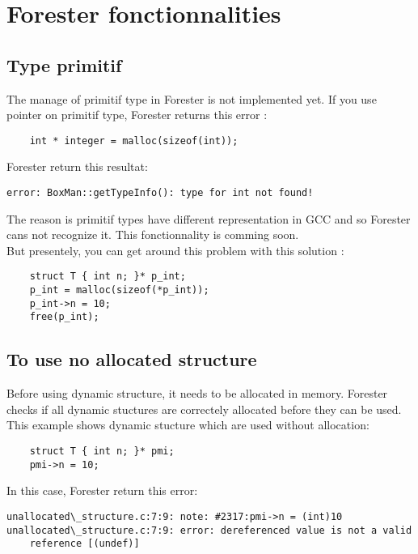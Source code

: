 \section {Forester fonctionnalities}

	\subsection{Type primitif}

The manage of primitif type in Forester is not implemented yet. If you use pointer on primitif type, Forester returns this error :

\begin{lstlisting}
	int * integer = malloc(sizeof(int));
\end{lstlisting}
\bigskip

Forester return this resultat:
\begin{lstlisting}
error: BoxMan::getTypeInfo(): type for int not found!
\end{lstlisting}
\bigskip


The reason is primitif types have different representation in GCC and so Forester cans not recognize it. This fonctionnality is comming soon.
\\

But presentely, you can get around this problem with this solution :
\begin{lstlisting}
	struct T { int n; }* p_int;
	p_int = malloc(sizeof(*p_int));
	p_int->n = 10;
	free(p_int);
\end{lstlisting}
\bigskip

	\subsection{To use no allocated structure}
	
Before using dynamic structure, it needs to be allocated in memory. Forester checks if all dynamic stuctures are correctely allocated before they can be used. This example shows dynamic stucture which are used without allocation:
\begin{lstlisting}
	struct T { int n; }* pmi;
	pmi->n = 10;
\end{lstlisting}
\bigskip

In this case, Forester return this error:
\begin{lstlisting}
unallocated\_structure.c:7:9: note: #2317:pmi->n = (int)10
unallocated\_structure.c:7:9: error: dereferenced value is not a valid 
	reference [(undef)]
\end{lstlisting}
\bigskip

